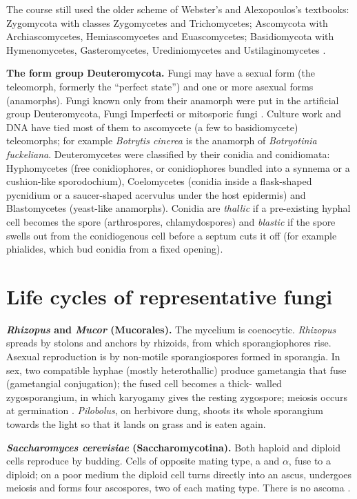 The course still used the older scheme of
Webster's and Alexopoulos's textbooks:
Zygomycota with classes Zygomycetes and
Trichomycetes; Ascomycota with
Archiascomycetes, Hemiascomycetes and
Euascomycetes; Basidiomycota with
Hymenomycetes, Gasteromycetes,
Urediniomycetes and Ustilaginomycetes
\cite[Section 1.5]{webster2007fungi}.

\textbf{The form group Deuteromycota.}
Fungi may have a sexual form (the
teleomorph, formerly the ``perfect state'')
and one or more asexual forms (anamorphs).
Fungi known only from their anamorph were
put in the artificial group Deuteromycota,
Fungi Imperfecti or mitosporic fungi
\cite[Section 1.4]{webster2007fungi}.
Culture work and DNA have tied most of them
to ascomycete (a few to basidiomycete)
teleomorphs; for example \emph{Botrytis
cinerea} is the anamorph of
\emph{Botryotinia fuckeliana}. Deuteromycetes
were classified by their conidia and
conidiomata: Hyphomycetes (free
conidiophores, or conidiophores bundled into
a synnema or a cushion-like sporodochium),
Coelomycetes (conidia inside a flask-shaped
pycnidium or a saucer-shaped acervulus under
the host epidermis) and Blastomycetes
(yeast-like anamorphs). Conidia are
\emph{thallic} if a pre-existing hyphal cell
becomes the spore (arthrospores,
chlamydospores) and \emph{blastic} if the
spore swells out from the conidiogenous cell
before a septum cuts it off (for example
phialides, which bud conidia from a fixed
opening).

\section{Life cycles of representative fungi}
\label{section-life-cycles}

\textbf{\emph{Rhizopus} and \emph{Mucor}
(Mucorales).}
The mycelium is coenocytic. \emph{Rhizopus}
spreads by stolons and anchors by rhizoids,
from which sporangiophores rise. Asexual
reproduction is by non-motile sporangiospores
formed in sporangia. In sex, two compatible
hyphae (mostly heterothallic) produce
gametangia that fuse (gametangial
conjugation); the fused cell becomes a thick-
walled zygosporangium, in which karyogamy
gives the resting zygospore; meiosis occurs
at germination
\cite[Chapter 7]{webster2007fungi}.
\emph{Pilobolus}, on herbivore dung, shoots
its whole sporangium towards the light so
that it lands on grass and is eaten again.

\textbf{\emph{Saccharomyces cerevisiae}
(Saccharomycotina).}
Both haploid and diploid cells reproduce by
budding. Cells of opposite mating type, a and
$\alpha$, fuse to a diploid;
on a poor medium the diploid cell turns
directly into an ascus, undergoes meiosis and
forms four ascospores, two of each mating
type. There is no ascoma
\cite[Chapter 10]{webster2007fungi}.


